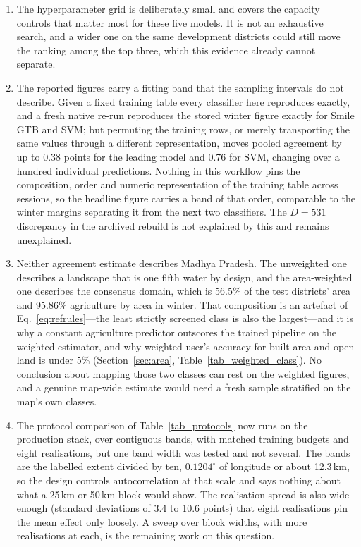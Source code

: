 \documentclass[conference]{IEEEtran}
\begin{document}
\begin{enumerate}
    \item The hyperparameter grid is deliberately small and covers the capacity controls that matter most for these five models. It is not an exhaustive search, and a wider one on the same development districts could still move the ranking among the top three, which this evidence already cannot separate.
    \item The reported figures carry a fitting band that the sampling intervals do not describe. Given a fixed training table every classifier here reproduces exactly, and a fresh native re-run reproduces the stored winter figure exactly for Smile GTB and SVM; but permuting the training rows, or merely transporting the same values through a different representation, moves pooled agreement by up to 0.38 points for the leading model and 0.76 for SVM, changing over a hundred individual predictions. Nothing in this workflow pins the composition, order and numeric representation of the training table across sessions, so the headline figure carries a band of that order, comparable to the winter margins separating it from the next two classifiers. The $D=531$ discrepancy in the archived rebuild is not explained by this and remains unexplained.
    \item Neither agreement estimate describes Madhya Pradesh. The unweighted one describes a landscape that is one fifth water by design, and the area-weighted one describes the consensus domain, which is 56.5\% of the test districts' area and 95.86\% agriculture by area in winter. That composition is an artefact of Eq.~\eqref{eq:refrules}---the least strictly screened class is also the largest---and it is why a constant agriculture predictor outscores the trained pipeline on the weighted estimator, and why weighted user's accuracy for built area and open land is under 5\% (Section~\ref{sec:area}, Table~\ref{tab_weighted_class}). No conclusion about mapping those two classes can rest on the weighted figures, and a genuine map-wide estimate would need a fresh sample stratified on the map's own classes.
    \item The protocol comparison of Table~\ref{tab_protocols} now runs on the production stack, over contiguous bands, with matched training budgets and eight realisations, but one band width was tested and not several. The bands are the labelled extent divided by ten, $0.1204^\circ$ of longitude or about 12.3\,km, so the design controls autocorrelation at that scale and says nothing about what a 25\,km or 50\,km block would show. The realisation spread is also wide enough (standard deviations of 3.4 to 10.6 points) that eight realisations pin the mean effect only loosely. A sweep over block widths, with more realisations at each, is the remaining work on this question.

\end{enumerate}
\end{document}
